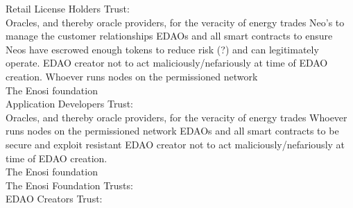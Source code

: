 \documentclass{article}
\theoremstyle{definition}
\theoremstyle{plain} %
\begin{document}
Retail License Holders Trust:\\

Oracles, and thereby oracle providers, for the veracity of energy trades
Neo’s to manage the customer relationships
EDAOs and all smart contracts to ensure Neos have escrowed enough tokens to reduce risk (?) and can legitimately operate.
EDAO creator not to act maliciously/nefariously at time of EDAO creation.
Whoever runs nodes on the permissioned network \\

The Enosi foundation\\

Application Developers Trust:\\

Oracles, and thereby oracle providers, for the veracity of energy trades
Whoever runs nodes on the permissioned network
EDAOs and all smart contracts to be secure and exploit resistant
EDAO creator not to act maliciously/nefariously at time of EDAO creation.\\

The Enosi foundation \\

The Enosi Foundation Trusts:\\

EDAO Creators Trust:\\
\end{document}
